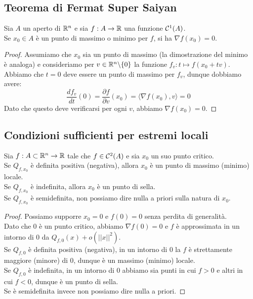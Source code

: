 \documentclass{article}
\begin{document}
\subsection{Teorema di Fermat Super Saiyan}

\begin{theorem}{}{}
    Sia $A$ un aperto di $\mathbb{R}^n$ e sia $f:A\to\mathbb{R}$ una funzione $\mathcal{C}^1(A)$.\\
    Se $x_0 \in A$ è un punto di massimo o minimo per $f$, si ha $\nabla f(x_0) = 0$.
\end{theorem}
\begin{proof}
    Assumiamo che $x_0$ sia un punto di massimo (la dimostrazione del minimo è analoga) e consideriamo per $v \in \mathbb{R}^n\backslash \{0\}$ la funzione $f_v : t\mapsto f(x_0 + tv)$.\\
    Abbiamo che $t=0$ deve essere un punto di massimo per $f_v$, dunque dobbiamo avere:
    \[\frac{df_v}{dt}(0) = \frac{\partial f}{\partial v}(x_0)=\langle\nabla f(x_0), v\rangle=0\]
    Dato che questo deve verificarsi per ogni $v$, abbiamo $\nabla f(x_0) = 0$.
\end{proof}

\subsection{Condizioni sufficienti per estremi locali}

\begin{theorem}{}{}
    Sia $f : A \subset \mathbb{R}^n\to\mathbb{R}$ tale che $f \in \mathcal{C}^2(A)$ e sia $x_0$ un suo punto critico.\\
    Se $Q_{f,x_0}$ è definita positiva (negativa), allora $x_0$ è un punto di massimo (minimo) locale.\\
    Se $Q_{f,x_0}$ è indefinita, allora $x_0$ è un punto di sella.\\
    Se $Q_{f,x_0}$ è semidefinita, non possiamo dire nulla a priori sulla natura di $x_0$.
\end{theorem}
\begin{proof}
    Possiamo supporre $x_0 = 0$ e $f(0) = 0$ senza perdita di generalità.\\
    Dato che $0$ è un punto critico, abbiamo $\nabla f(0) = 0$ e $f$ è approssimata in un intorno di $0$ da $Q_{f,0}(x)+o(||x||^2)$.\\
    Se $Q_{f,0}$ è definita positiva (negativa), in un intorno di $0$ la $f$ è strettamente maggiore (minore) di $0$, dunque è un massimo (minimo) locale.\\
    Se $Q_{f,0}$ è indefinita, in un intorno di $0$ abbiamo sia punti in cui $f>0$ e altri in cui $f<0$, dunque è un punto di sella.\\
    Se è semidefinita invece non possiamo dire nulla a priori.
\end{proof}
\end{document}
